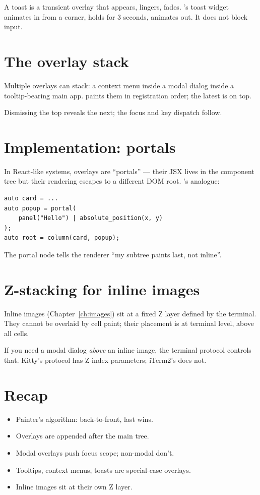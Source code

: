 A toast is a transient overlay that appears, lingers, fades.
\maya{}'s toast widget animates in from a corner, holds for 3
seconds, animates out. It does not block input.

\section{The overlay stack}

Multiple overlays can stack: a context menu inside a modal
dialog inside a tooltip-bearing main app. \maya{} paints them
in registration order; the latest is on top.

Dismissing the top reveals the next; the focus and key
dispatch follow.

\section{Implementation: portals}

In React-like systems, overlays are ``portals'' --- their
JSX lives in the component tree but their rendering escapes
to a different DOM root. \maya{}'s analogue:

\begin{lstlisting}
auto card = ...
auto popup = portal(
    panel("Hello") | absolute_position(x, y)
);
auto root = column(card, popup);
\end{lstlisting}

The portal node tells the renderer ``my subtree paints last,
not inline''.

\section{Z-stacking for inline images}

Inline images (Chapter~\ref{ch:images}) sit at a fixed Z layer
defined by the terminal. They cannot be overlaid by cell
paint; their placement is at terminal level, above all cells.

If you need a modal dialog \emph{above} an inline image, the
terminal protocol controls that. Kitty's protocol has
Z-index parameters; iTerm2's does not.

\section{Recap}

\begin{recap}
\begin{itemize}[leftmargin=*]
  \item Painter's algorithm: back-to-front, last wins.
  \item Overlays are appended after the main tree.
  \item Modal overlays push focus scope; non-modal don't.
  \item Tooltips, context menus, toasts are special-case
    overlays.
  \item Inline images sit at their own Z layer.
\end{itemize}
\end{recap}


